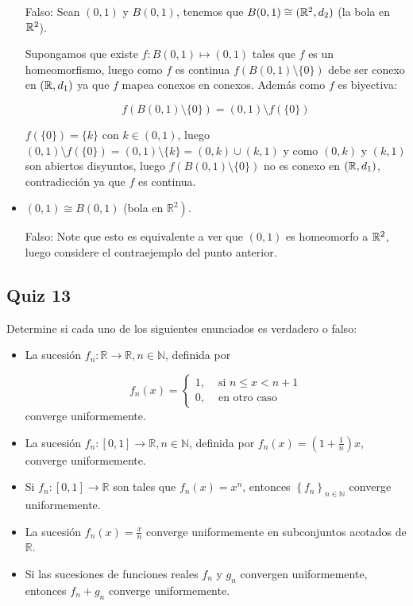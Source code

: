 \begin{itemize}[leftmargin=*]
Falso: Sean $(0,1)$ y $B(0,1)$, tenemos que $B(0,1)\cong (\mathbb{R}^2,d_2)$ (la bola en $\mathbb{R}^2$).

Supongamos que existe $f:B(0,1)\mapsto (0,1)$ tales que $f$ es un homeomorfismo, luego como $f$ es continua $f(B(0,1)\setminus\{0\})$ debe ser conexo en $(\mathbb{R},d_1)$ ya que $f$ mapea conexos en conexos. Además como $f$ es biyectiva:

$$f(B(0,1)\setminus\{0\})=(0,1)\setminus f(\{0\})$$

$f(\{0\})=\{k\}$ con $k\in (0,1)$, luego $(0,1)\setminus f(\{0\})=(0,1)\setminus \{k\}=(0,k)\cup (k,1)$ y como $(0,k)$ y $(k,1)$ son abiertos disyuntos, luego $f(B(0,1)\setminus\{0\})$ no es conexo en $(\mathbb{R},d_1)$, contradicción ya que $f$ es continua.

\item   $(0,1) \cong B(0,1)$ (bola en $\left.\mathbb{R}^2\right)$.

Falso: Note que esto es equivalente a ver que $(0,1)$ es homeomorfo a $\mathbb{R}^2$, luego considere el contraejemplo del punto anterior.
\end{itemize}



\subsection{Quiz 13}

Determine si cada uno de los siguientes enunciados es verdadero o falso:

\begin{itemize}[leftmargin=*]
   
\item  La sucesión $f_n: \mathbb{R} \rightarrow \mathbb{R}, n \in \mathbb{N}$, definida por

$$
f_n(x)= \begin{cases}1, & \text { si } n \leq x<n+1 \\ 0, & \text { en otro caso }\end{cases}
$$
converge uniformemente.\\

\item  La sucesión $f_n:[0,1] \rightarrow \mathbb{R}, n \in \mathbb{N}$, definida por $f_n(x)=\left(1+\frac{1}{n}\right) x$, converge uniformemente.\\

\item Si $f_n:[0,1] \rightarrow \mathbb{R}$ son tales que $f_n(x)=x^n$, entonces $\left\{f_n\right\}_{n \in \mathbb{N}}$ converge uniformemente.\\

\item La sucesión $f_n(x)=\frac{x}{n}$ converge uniformemente en subconjuntos acotados de $\mathbb{R}$.\\

\item  Si las sucesiones de funciones reales $f_n$ y $g_n$ convergen uniformemente, entonces $f_n+g_n$ converge uniformemente.

\end{itemize}

